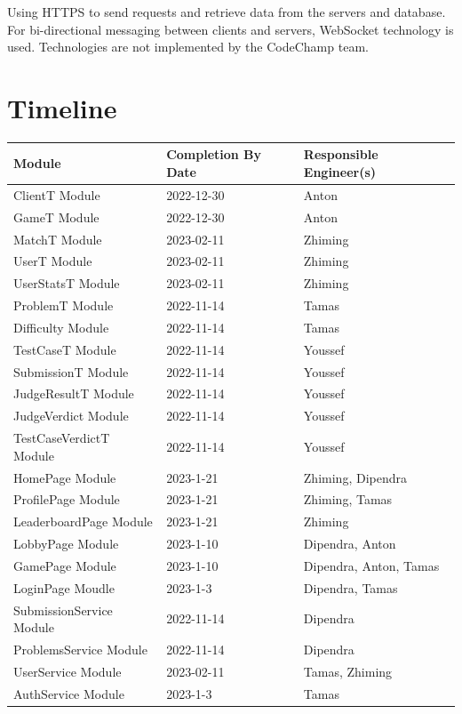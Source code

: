 \documentclass[12pt, titlepage]{article}
\begin{document}
Using HTTPS to send requests and retrieve data from the servers and database. For bi-directional messaging between clients and servers, WebSocket technology is used. Technologies are not implemented by the CodeChamp team.

\section{Timeline}


\begin{table}[H]
\centering
\begin{tabular}{p{} p{}  p{}}
\toprule
Module & Completion By Date & Responsible Engineer(s) \\
\midrule
ClientT Module & 2022-12-30 & Anton\\
GameT Module & 2022-12-30 & Anton\\
MatchT Module & 2023-02-11 & Zhiming\\
UserT Module & 2023-02-11 & Zhiming\\
UserStatsT Module & 2023-02-11 & Zhiming\\
ProblemT Module & 2022-11-14 & Tamas\\ 
Difficulty Module & 2022-11-14 & Tamas\\
TestCaseT Module & 2022-11-14 & Youssef\\
SubmissionT Module & 2022-11-14 & Youssef\\
JudgeResultT Module & 2022-11-14 & Youssef\\
JudgeVerdict Module & 2022-11-14 & Youssef\\
TestCaseVerdictT Module & 2022-11-14 & Youssef\\
HomePage Module & 2023-1-21 & Zhiming, Dipendra\\
ProfilePage Module & 2023-1-21 & Zhiming, Tamas\\
LeaderboardPage Module & 2023-1-21 & Zhiming \\
LobbyPage Module & 2023-1-10 & Dipendra, Anton \\
GamePage Module & 2023-1-10 & Dipendra, Anton, Tamas \\
LoginPage Moudle & 2023-1-3 &  Dipendra, Tamas\\
SubmissionService Module & 2022-11-14 & Dipendra\\
ProblemsService Module & 2022-11-14 & Dipendra\\
UserService Module & 2023-02-11 & Tamas, Zhiming\\
AuthService Module & 2023-1-3 & Tamas\\

\end{tabular}
\end{table}
\end{document}

